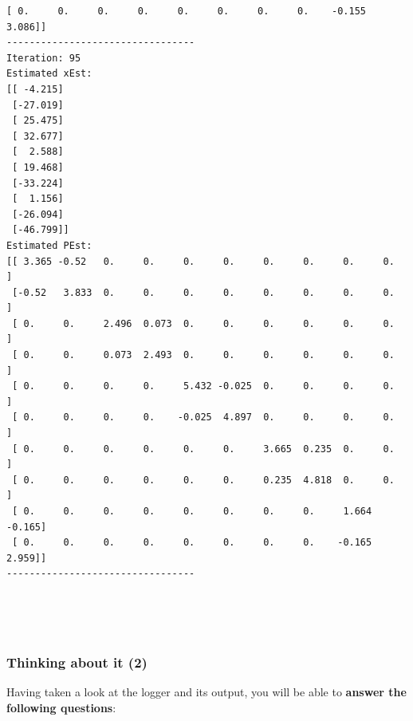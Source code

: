 \documentclass[11pt]{article}
\begin{document}
\begin{Verbatim}[commandchars=\\\{\}]
 [ 0.     0.     0.     0.     0.     0.     0.     0.    -0.155  3.086]]
---------------------------------
Iteration: 95
Estimated xEst:
[[ -4.215]
 [-27.019]
 [ 25.475]
 [ 32.677]
 [  2.588]
 [ 19.468]
 [-33.224]
 [  1.156]
 [-26.094]
 [-46.799]]
Estimated PEst:
[[ 3.365 -0.52   0.     0.     0.     0.     0.     0.     0.     0.   ]
 [-0.52   3.833  0.     0.     0.     0.     0.     0.     0.     0.   ]
 [ 0.     0.     2.496  0.073  0.     0.     0.     0.     0.     0.   ]
 [ 0.     0.     0.073  2.493  0.     0.     0.     0.     0.     0.   ]
 [ 0.     0.     0.     0.     5.432 -0.025  0.     0.     0.     0.   ]
 [ 0.     0.     0.     0.    -0.025  4.897  0.     0.     0.     0.   ]
 [ 0.     0.     0.     0.     0.     0.     3.665  0.235  0.     0.   ]
 [ 0.     0.     0.     0.     0.     0.     0.235  4.818  0.     0.   ]
 [ 0.     0.     0.     0.     0.     0.     0.     0.     1.664 -0.165]
 [ 0.     0.     0.     0.     0.     0.     0.     0.    -0.165  2.959]]
---------------------------------
    \end{Verbatim}

    \begin{center}
    \end{center}
    { \hspace*{\fill} \\}
    
    \begin{center}
    \end{center}
    { \hspace*{\fill} \\}
    
    \hypertarget{thinking-about-it-2}{%
\subsubsection{Thinking about it (2)}\label{thinking-about-it-2}}

Having taken a look at the logger and its output, you will be able to
\textbf{answer the following questions}:
\end{document}
